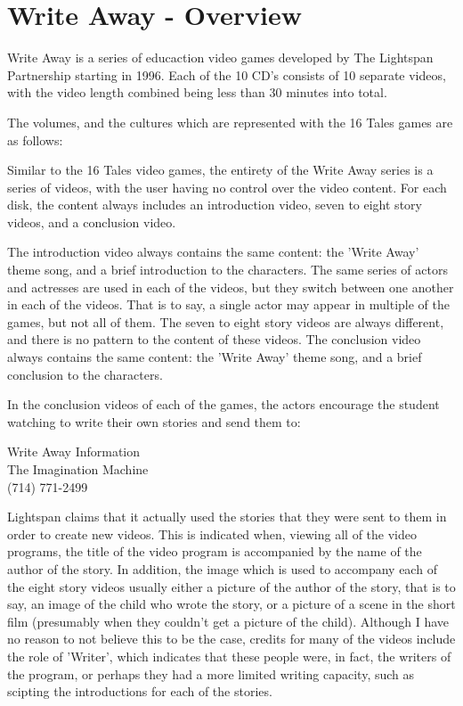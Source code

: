 \chapter{Write Away - Overview}

Write Away is a series of educaction video games developed by The Lightspan Partnership starting in 1996.
Each of the 10 CD's consists of 10 separate videos, with the video length combined being less than 30 minutes into total.

The volumes, and the cultures which are represented with the 16 Tales games are as follows:

Similar to the 16 Tales video games, the entirety of the Write Away series is a series of videos, with the user having no control over the video content.
For each disk, the content always includes an introduction video, seven to eight story videos, and a conclusion video.

The introduction video always contains the same content: the 'Write Away' theme song, and a brief introduction to the characters.
The same series of actors and actresses are used in each of the videos, but they switch between one another in each of the videos.
That is to say, a single actor may appear in multiple of the games, but not all of them.
The seven to eight story videos are always different, and there is no pattern to the content of these videos.
The conclusion video always contains the same content: the 'Write Away' theme song, and a brief conclusion to the characters.

In the conclusion videos of each of the games, the actors encourage the student watching to write their own stories and send them to:

\begin{center}
    Write Away Information\\
    The Imagination Machine\\
    (714) 771-2499
\end{center}

Lightspan claims that it actually used the stories that they were sent to them in order to create new videos.
This is indicated when, viewing all of the video programs, the title of the video program is accompanied by the name of the author of the story.
In addition, the image which is used to accompany each of the eight story videos usually either a picture of the author of the story, that is to say, an image of the child who wrote the story, or a picture of a scene in the short film (presumably when they couldn't get a picture of the child).
Although I have no reason to not believe this to be the case, credits for many of the videos include the role of 'Writer', which indicates that these people were, in fact, the writers of the program, or perhaps they had a more limited writing capacity, such as scipting the introductions for each of the stories.

